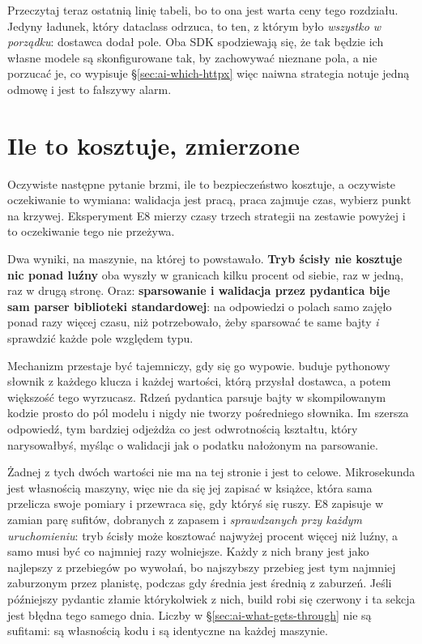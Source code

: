Przeczytaj teraz ostatnią linię tabeli, bo to ona jest warta ceny tego
rozdziału. Jedyny ładunek, który dataclass odrzuca, to ten, z którym było
\emph{wszystko w porządku}: dostawca dodał pole. Oba SDK spodziewają się, że
tak będzie \dash{} ich własne modele są skonfigurowane tak, by zachowywać
nieznane pola, a nie porzucać je, co wypisuje \S\ref{sec:ai-which-httpx}
\dash{} więc naiwna strategia notuje jedną odmowę i jest to fałszywy alarm.

\section{Ile to kosztuje, zmierzone}
\label{sec:ai-what-costs}

Oczywiste następne pytanie brzmi, ile to bezpieczeństwo kosztuje, a oczywiste
oczekiwanie to wymiana: walidacja jest pracą, praca zajmuje czas, wybierz
punkt na krzywej. Eksperyment E8 mierzy czasy trzech strategii na zestawie
powyżej i to oczekiwanie tego nie przeżywa.

Dwa wyniki, na maszynie, na której to powstawało. \textbf{Tryb ścisły nie
kosztuje nic ponad luźny} \dash{} oba wyszły w granicach kilku procent od
siebie, raz w jedną, raz w drugą stronę. Oraz: \textbf{sparsowanie i
walidacja przez pydantica bije sam parser biblioteki standardowej}: na
odpowiedzi o  polach samo  zajęło
ponad  razy więcej czasu, niż
 potrzebowało, żeby sparsować te same bajty
\emph{i} sprawdzić każde pole względem typu.

Mechanizm przestaje być tajemniczy, gdy się go wypowie. 
buduje pythonowy słownik z każdego klucza i każdej wartości, którą przysłał
dostawca, a potem większość tego wyrzucasz. Rdzeń pydantica parsuje bajty w
skompilowanym kodzie prosto do pól modelu i nigdy nie tworzy pośredniego
słownika. Im szersza odpowiedź, tym bardziej odjeżdża \dash{} co jest
odwrotnością kształtu, który narysowałbyś, myśląc o walidacji jak o podatku
nałożonym na parsowanie.

\begin{note}
Żadnej z tych dwóch wartości nie ma na tej stronie i jest to celowe.
Mikrosekunda jest własnością maszyny, więc nie da się jej zapisać w książce,
która sama przelicza swoje pomiary i przewraca się, gdy któryś się ruszy. E8
zapisuje w zamian parę sufitów, dobranych z zapasem i
\emph{sprawdzanych przy każdym uruchomieniu}: tryb ścisły może kosztować
najwyżej  procent więcej niż luźny, a samo
 musi być co najmniej  razy wolniejsze.
Każdy z nich brany jest jako najlepszy z  przebiegów po
 wywołań, bo najszybszy przebieg jest tym najmniej
zaburzonym przez planistę, podczas gdy średnia jest średnią z zaburzeń.
Jeśli późniejszy pydantic złamie którykolwiek z nich, build robi się
czerwony i ta sekcja jest błędna tego samego dnia. Liczby w
\S\ref{sec:ai-what-gets-through} nie są sufitami: są własnością kodu i są
identyczne na każdej maszynie.
\end{note}

